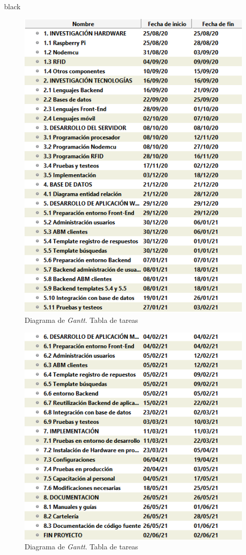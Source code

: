 \documentclass[11pt]{charter}
\begin{document}
\begin{consigna}{black}
\begin{figure}[htpb]
\centering 
\includegraphics[width=.8\textwidth]{./Figuras/Gantt-2-1.png}
\caption{Diagrama de \textit{Gantt}. Tabla de tareas}
\label{fig:AoN}
\end{figure}
\begin{figure}[htpb]
\centering 
\includegraphics[width=.8\textwidth]{./Figuras/Gantt-2-2.png}
\caption{Diagrama de \textit{Gantt}. Tabla de tareas}
\label{fig:AoN}
\end{figure}


\end{consigna}
\end{document}
